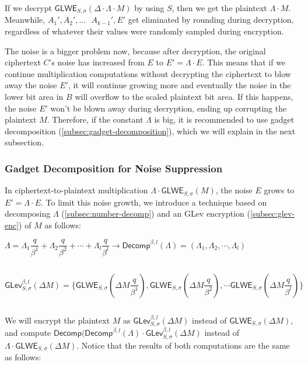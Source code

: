 If we decrypt $\textsf{GLWE}_{S, \sigma}(\Delta \cdot \Lambda \cdot M)$ by using $S$, then we get the plaintext $\Lambda \cdot M$. Meanwhile, $A_1', A_2', ... \text{ } A_{k-1}', E'$ get eliminated by rounding during decryption, regardless of whatever their values were randomly sampled during encryption. 

The noise is a bigger problem now, because after decryption, the original ciphertext $C$'s noise has increased from $E$ to $E' = \Lambda \cdot E$. This means that if we continue multiplication computations without decrypting the ciphertext to blow away the noise $E'$, it will continue growing more and eventually the noise in the lower bit area in $B$ will overflow to the scaled plaintext bit area. If this happens, the noise $E'$ won't be blown away during decryption, ending up corrupting the plaintext $M$. Therefore, if the constant $\Lambda$ is big, it is recommended to use gadget decomposition (\autoref{subsec:gadget-decomposition}), which we will explain in the next subsection. 

\subsubsection{Gadget Decomposition for Noise Suppression}
\label{subsubsec:gadget-decomposition-noise-suppression}

In ciphertext-to-plaintext multiplication $\Lambda \cdot \textsf{GLWE}_{S, \sigma}(M)$, the noise $E$ grows to $E' = \Lambda \cdot E$. To limit this noise growth, we introduce a technique based on decomposing $\Lambda$ (\autoref{subsec:number-decomp}) and an GLev encryption (\autoref{subsec:glev-enc}) of $M$ as follows:


$\Lambda = \Lambda_1 \dfrac{q}{\beta^1} + \Lambda_2 \dfrac{q}{\beta^2} + \cdots + \Lambda_l \dfrac{q}{\beta^l} \longrightarrow \textsf{Decomp}^{\beta, l}(\Lambda) = (\Lambda_1, \Lambda_2, \cdots, \Lambda_l)$

$ $

$\textsf{GLev}_{S, \sigma}^{\beta, l}(\Delta M) = \Bigg\{ \textsf{GLWE}_{S, \sigma}\left(\Delta M \dfrac{q}{\beta^1}\right), \textsf{GLWE}_{S, \sigma}\left(\Delta M \dfrac{q}{\beta^2}\right), \cdots \textsf{GLWE}_{S, \sigma}\left(\Delta M \dfrac{q}{\beta^l}\right) \Bigg\}$

$ $


We will encrypt the plaintext $M$ as $\textsf{GLev}_{S, \sigma}^{\beta, l}(\Delta M)$ instead of $\textsf{GLWE}_{S, \sigma}(\Delta M)$, and compute $\textsf{Decomp}(\textsf{Decomp}^{\beta, l}(\Lambda) \cdot \textsf{GLev}_{S, \sigma}^{\beta, l}(\Delta M)$ instead of $\Lambda \cdot \textsf{GLWE}_{S, \sigma}(\Delta M)$. Notice that the results of both computations are the same as follows:

